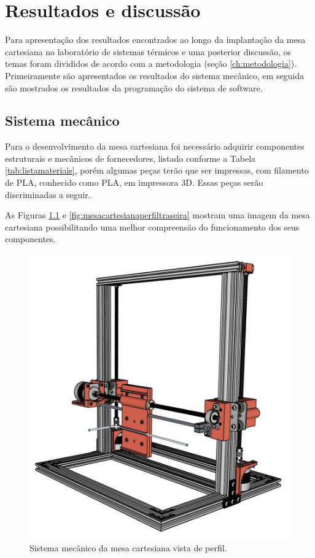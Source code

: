 \chapter{Resultados e discussão}
\label{chap:resultados}

Para apresentação dos resultados encontrados ao longo da implantação da mesa cartesiana no 
laboratório de sistemas térmicos e uma posterior discussão, os temas foram divididos de acordo 
com a metodologia (seção \ref{ch:metodologia}). Primeiramente são apresentados os resultados do sistema mecânico, 
em seguida são mostrados os resultados da programação do sistema de software.

\section{Sistema mecânico}\label{sec:resmecanico}

Para o desenvolvimento da mesa cartesiana foi necessário adquirir componentes estruturais e 
mecânicos de fornecedores, listado conforme a Tabela \ref{tab:listamateriais}, porém algumas peças terão 
que ser impressas, com filamento de \ac{PLA}, conhecido 
como \ac{PLA}, em impressora 3D. Essas peças serão discriminadas a seguir. 

As Figuras \ref{fig:mesacartesianaperfil} e \ref{fig:mesacartesianaperfiltraseira} mostram uma 
imagem da mesa cartesiana possibilitando uma melhor compreensão do funcionamento dos seus componentes.

\begin{figure}[H]
\centering
\caption{Sistema mecânico da mesa cartesiana vista de perfil.}\label{fig:mesacartesianaperfil}
\includegraphics[scale = 0.35]{figuras/mesacartesianaperfil}
\end{figure}

